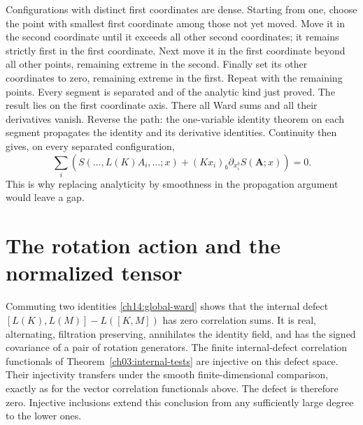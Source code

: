 Configurations with distinct first coordinates are dense. Starting
from one, choose the point with smallest first coordinate among
those not yet moved. Move it in the second coordinate until it
exceeds all other second coordinates; it remains strictly first in
the first coordinate. Next move it in the first coordinate beyond
all other points, remaining extreme in the second. Finally set its
other coordinates to zero, remaining extreme in the first. Repeat
with the remaining points. Every segment is separated and of the
analytic kind just proved. The result lies on the first coordinate
axis. There all Ward sums and all their derivatives vanish.
Reverse the path: the one-variable identity theorem on each segment
propagates the identity and its derivative identities. Continuity
then gives, on every separated configuration,
\begin{equation}\label{ch14:global-ward}
 \sum_i\left(S(\ldots,L(K)A_i,\ldots;x)
                  +(Kx_i)_b\partial_{x_i^b}S(\boldsymbol A;x)\right)=0.
\end{equation}
This is why replacing analyticity by smoothness in the propagation
argument would leave a gap.

\section{The rotation action and the normalized tensor}
\label{ch14:rotations-section}

Commuting two identities \eqref{ch14:global-ward} shows that the
internal defect
$[L(K),L(M)]-L([K,M])$ has zero correlation sums. It is real,
alternating, filtration preserving, annihilates the identity field, and has the
signed covariance of a pair of rotation generators. The finite
internal-defect correlation functionals of Theorem~\ref{ch03:internal-tests} are
injective on this defect space. Their injectivity transfers under
the smooth finite-dimensional comparison, exactly as for the vector
correlation functionals above. The defect is therefore zero. Injective inclusions
extend this conclusion from any sufficiently large degree to the
lower ones.

